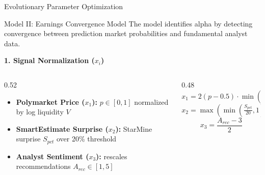 \documentclass[final]{beamer}
\newlength{\colwidth}
\begin{document}
\begin{frame}[t]
\begin{columns}[t]
\begin{column}{\colwidth}
\begin{block}{Evolutionary Parameter Optimization}
  \end{block}  



  \begin{block}{Model II: Earnings Convergence Model}
    The model identifies alpha by detecting convergence between prediction market probabilities and fundamental analyst data.

    \textbf{1. Signal Normalization ($x_i$)}

    \begin{columns}[t]
      \begin{column}{0.52\linewidth}
        \begin{itemize}
          \setlength{\itemsep}{4pt}\setlength{\parsep}{0pt}
          \item \textbf{Polymarket Price ($x_1$):} $p \in [0,1]$ normalized by log liquidity $V$
          \item \textbf{SmartEstimate Surprise ($x_2$):} StarMine surprise $S_{pct}$ over 20\% threshold
          \item \textbf{Analyst Sentiment ($x_3$):} rescales recommendations $A_{rec} \in [1,5]$
        \end{itemize}
      \end{column}
      \begin{column}{0.48\linewidth}
        \[ x_1 = 2(p - 0.5) \cdot \min\!\left( \tfrac{\log_{10}(V)}{5}, 1 \right) \]
        \[ x_2 = \max\!\left(\min\!\left(\tfrac{S_{pct}}{20}, 1\right), -1\right) \]
        \[ x_3 = \frac{A_{rec} - 3}{2} \]
      \end{column}
    \end{columns}

  \end{block}





\end{column}
\end{columns}
\end{frame}
\end{document}
